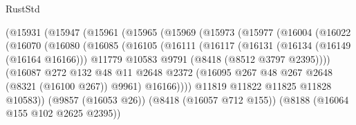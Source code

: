 \begin{lexlean}{RustStd}
\begin{coremodule}
                          (@15931
                            (@15947
                              (@15961
                                (@15965
                                  (@15969
                                    (@15973
                                      (@15977
                                        (@16004
                                          (@16022
                                            (@16070
                                              (@16080
                                                (@16085
                                                  (@16105
                                                    (@16111
                                                      (@16117
                                                        (@16131
                                                          (@16134 (@16149 (@16164 @16166)))
                                                          @11779
                                                          @10583
                                                          @9791
                                                          (@8418 (@8512 @3797 @2395))))
                                                      (@16087
                                                        @272
                                                        @132
                                                        @48
                                                        @11
                                                        @2648
                                                        @2372
                                                        (@16095
                                                          @267
                                                          @48
                                                          @267
                                                          @2648
                                                          (@8321 (@16100 @267))
                                                          @9961)
                                                        @16166))))
                                                @11819
                                                @11822
                                                @11825
                                                @11828
                                                @10583))
                                            (@9857 (@16053 @26))
                                            (@8418 (@16057 @712 @155))
                                            (@8188 (@16064 @155 @102 @2625 @2395))

\end{coremodule}
\end{lexlean}
